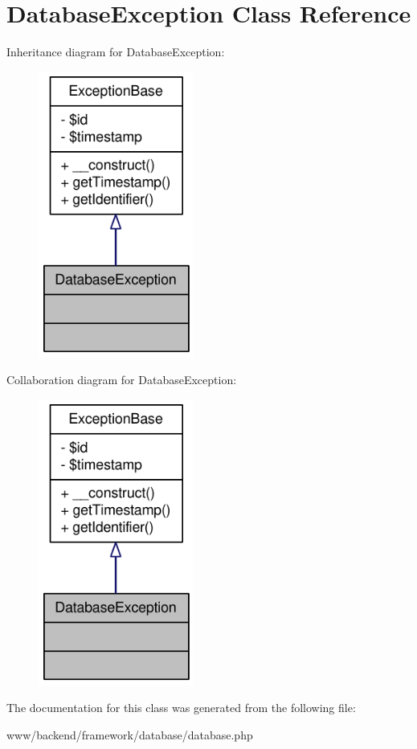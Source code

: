 \hypertarget{classDatabaseException}{
\section{DatabaseException Class Reference}
\label{classDatabaseException}
}


Inheritance diagram for DatabaseException:\nopagebreak
\begin{figure}[H]
\begin{center}
\leavevmode
\includegraphics[width=144pt]{classDatabaseException__inherit__graph}
\end{center}
\end{figure}


Collaboration diagram for DatabaseException:\nopagebreak
\begin{figure}[H]
\begin{center}
\leavevmode
\includegraphics[width=144pt]{classDatabaseException__coll__graph}
\end{center}
\end{figure}


The documentation for this class was generated from the following file:\begin{DoxyCompactItemize}
\item 
www/backend/framework/database/database.php\end{DoxyCompactItemize}
